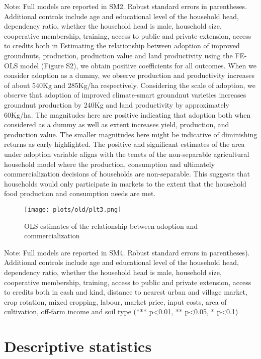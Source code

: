 \documentclass[
]{article}
\begin{document}
Note: Full models are reported in SM2. Robust standard errors in parentheses. Additional controls include age and educational level of the household head, dependency ratio, whether the household head is male, household size, cooperative membership, training, access to public and private extension, access to credits both in
\newpage
Estimating the relationship between adoption of improved groundnuts, production, production value and land productivity using the FE-OLS model (Figure S2), we obtain positive coefficients for all outcomes. When we consider adoption as a dummy, we observe production and productivity increases of about 540Kg and 285Kg/ha respectively. Considering the scale of adoption, we observe that adoption of improved climate-smart groundnut varieties increases groundnut production by 240Kg and land productivity by approximately 60Kg/ha. The magnitudes here are positive indicating that adoption both when considered as a dummy as well as extent increases yield, production, and production value. The smaller magnitudes here might be indicative of diminishing returns as early highlighted. The positive and significant estimates of the area under adoption variable aligns with the tenets of the non-separable agricultural household model where the production, consumption and ultimately commercialization decisions of households are non-separable. This suggests that households would only participate in markets to the extent that the household food production and consumption needs are met.

\begin{figure}[htbp]
\centering
\texttt{[image: plots/old/plt3.png]}
\caption{OLS estimates of the relationship between adoption and commercialization}
\end{figure}

Note: Full models are reported in SM4. Robust standard errors in parentheses). Additional controls include age and educational level of the household head, dependency ratio, whether the household head is male, household size, cooperative membership, training, access to public and private extension, access to credits both in cash and kind, distance to nearest urban and village market, crop rotation, mixed cropping, labour, market price, input costs, area of cultivation, off-farm income and soil type (*** p\textless0.01, ** p\textless0.05, * p\textless0.1)

\newpage

\hypertarget{descriptive-statistics}{%
\section{Descriptive statistics}\label{descriptive-statistics}}
\end{document}
